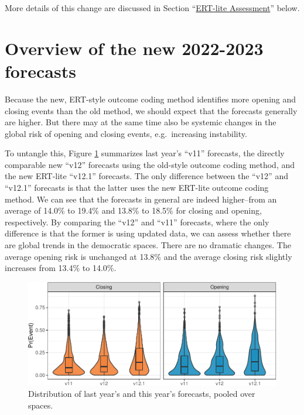 \documentclass[
  11pt,
]{article}
\begin{document}
More details of this change are discussed in Section
``\hyperlink{ert-lite-assessment}{ERT-lite Assessment}'' below.

\hypertarget{overview-of-the-new-2022-2023-forecasts}{%
\section{Overview of the new 2022-2023
forecasts}\label{overview-of-the-new-2022-2023-forecasts}}

Because the new, ERT-style outcome coding method identifies more opening
and closing events than the old method, we should expect that the
forecasts generally are higher. But there may at the same time also be
systemic changes in the global risk of opening and closing events,
e.g.~increasing instability.

To untangle this, Figure \ref{fig:new-forecast-plot} summarizes last
year's ``v11'' forecasts, the directly comparable new ``v12'' forecasts
using the old-style outcome coding method, and the new ERT-lite
``v12.1'' forecasts. The only difference between the ``v12'' and
``v12.1'' forecasts is that the latter uses the new ERT-lite outcome
coding method. We can see that the forecasts in general are indeed
higher--from an average of 14.0\% to 19.4\% and 13.8\% to 18.5\% for
closing and opening, respectively. By comparing the ``v12'' and ``v11''
forecasts, where the only difference is that the former is using updated
data, we can assess whether there are global trends in the democratic
spaces. There are no dramatic changes. The average opening risk is
unchanged at 13.8\% and the average closing risk slightly increases from
13.4\% to 14.0\%.

\begin{figure}
\centering
\includegraphics{democratic-spaces-2022_files/figure-latex/new-forecast-plot-1.pdf}
\caption{Distribution of last year's and this year's forecasts, pooled
over spaces.\label{fig:new-forecast-plot}}
\end{figure}
\end{document}
